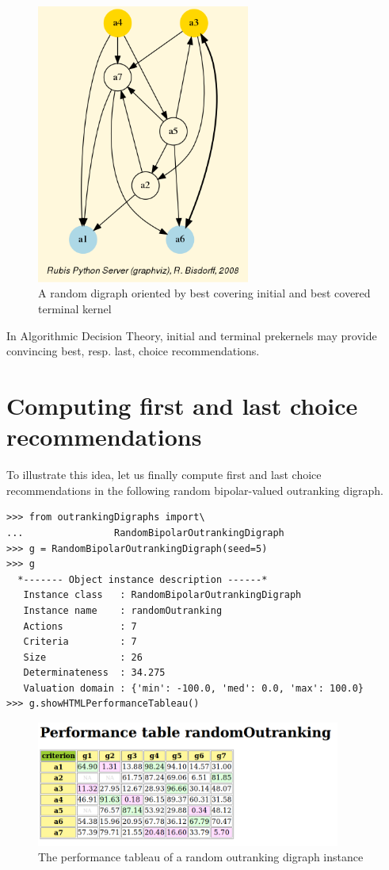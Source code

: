\begin{figure}[h]
\sidecaption
\includegraphics[width=7cm]{Figures/orientedLaterality.png}
\caption{A random digraph oriented by best covering initial and
   best covered terminal kernel}
\label{fig:17.6}       %
\end{figure}

In Algorithmic Decision Theory, initial and terminal prekernels may provide convincing best, resp. last, choice recommendations.


\section{Computing first and last choice recommendations}
\label{sec:17.4}

To illustrate this idea, let us finally compute first and last choice recommendations in the following random bipolar-valued outranking digraph.
\begin{lstlisting}
>>> from outrankingDigraphs import\
...                RandomBipolarOutrankingDigraph
>>> g = RandomBipolarOutrankingDigraph(seed=5)
>>> g
  *------- Object instance description ------*
   Instance class   : RandomBipolarOutrankingDigraph
   Instance name    : randomOutranking
   Actions          : 7
   Criteria         : 7
   Size             : 26
   Determinateness  : 34.275
   Valuation domain : {'min': -100.0, 'med': 0.0, 'max': 100.0}
>>> g.showHTMLPerformanceTableau()
\end{lstlisting}
\begin{figure}[h]
\includegraphics[width=10cm]{Figures/randomOutranking.png}
\caption{The performance tableau of a random outranking digraph instance}
\label{fig:17.7}       %
\end{figure}

